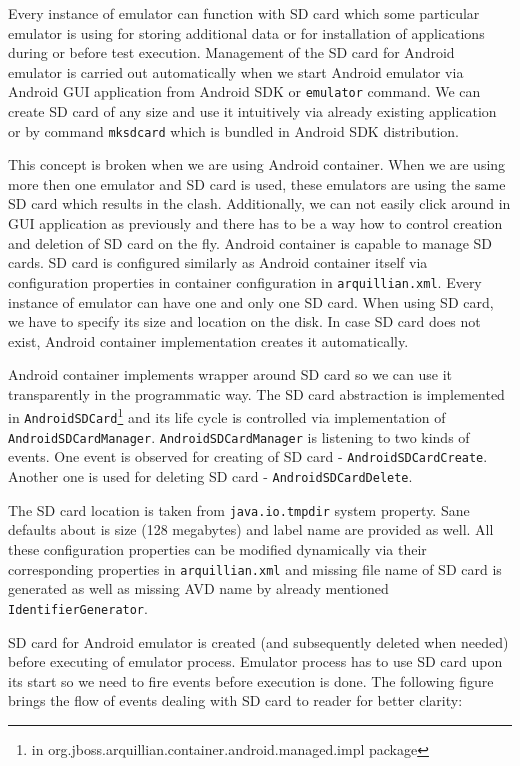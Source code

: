 \documentclass[12pt,final,oneside]{fithesis}
\begin{document}
Every instance of emulator can function with SD card which some particular emulator is using for storing additional data or for installation of applications during or before test execution. Management of the SD card for Android emulator is carried out automatically when we start Android emulator via Android GUI application from Android SDK or \texttt{emulator} command. We can create SD card of any size and use it intuitively via already existing application or by command \texttt{mksdcard} which is bundled in Android SDK distribution.

This concept is broken when we are using Android container. When we are using more then one emulator and SD card is used, these emulators are using the same SD card which results in the clash. Additionally, we can not easily click around in GUI application as previously and there has to be a way how to control creation and deletion of SD card on the fly. Android container is capable to manage SD cards. SD card is configured similarly as Android container itself via configuration properties in container configuration in \texttt{arquillian.xml}. Every instance of emulator can have one and only one SD card. When using SD card, we have to specify its size and location on the disk. In case SD card does not exist, Android container implementation creates it automatically.

Android container implements wrapper around SD card so we can use it transparently in the programmatic way. The SD card abstraction is implemented in \texttt{AndroidSDCard}\footnote{in org.jboss.arquillian.container.android.managed.impl package} and its life cycle is controlled via implementation of \texttt{AndroidSDCardManager}. \texttt{AndroidSDCardManager} is listening to two kinds of events. One event is observed for creating of SD card - \texttt{AndroidSDCardCreate}. Another one is used for deleting SD card - \texttt{AndroidSDCardDelete}.

The SD card location is taken from \texttt{java.io.tmpdir} system property. Sane defaults about is size (128 megabytes) and label name are provided as well. All these configuration properties can be modified dynamically via their corresponding properties in \texttt{arquillian.xml} and missing file name of SD card is generated as well as missing AVD name by already mentioned \texttt{IdentifierGenerator}.

SD card for Android emulator is created (and subsequently deleted when needed) before executing of emulator process. Emulator process has to use SD card upon its start so we need to fire events before execution is done. The following figure brings the flow of events dealing with SD card to reader for better clarity:
\end{document}
